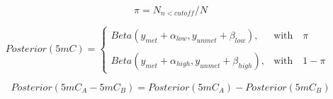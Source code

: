 \documentclass[a4paper]{article}
\begin{document}
\begin{equation*}
\pi = N_{n < cutoff} / N
\end{equation*}

\newpage

\begin{equation*}
Posterior(5mC) = 
\begin{cases} 
Beta(y_{met} + \alpha_{low}, y_{unmet} + \beta_{low}) , & \mbox{with } \mbox{ $\pi$ } \\
\\
Beta(y_{met} + \alpha_{high}, y_{unmet} + \beta_{high}), & \mbox{with } \mbox{ $1 - \pi$ }
\end{cases}
\end{equation*}

\newpage

\newpage
\begin{equation*}
Posterior(5mC_{A} - 5mC_{B}) = Posterior(5mC_{A}) - Posterior(5mC_{B})
\end{equation*}
\end{document}
